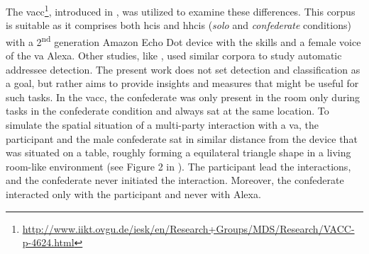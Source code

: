 The \acf{vacc}\footnote{\url{http://www.iikt.ovgu.de/iesk/en/Research+Groups/MDS/Research/VACC-p-4624.html}}, introduced in \citet{Siegert2018VACC}, was utilized to examine these differences.
This corpus is suitable as it comprises both \acp{hci} and \acp{hhci} (\emph{solo} and \emph{confederate} conditions) with a 2\textsuperscript{nd} generation Amazon Echo Dot device with the skills and a female voice of the \acf{va} Alexa.
Other studies, like \citet{Shriberg2013addressee,vanTurnhout2005identifying}, used similar corpora to study automatic addressee detection.
The present work does not set detection and classification as a goal, but rather aims to provide insights and measures that might be useful for such tasks.
In the \ac{vacc}, the confederate was only present in the room only during tasks in the confederate condition and always sat at the same location.
To simulate the spatial situation of a multi-party interaction with a \ac{va}, the participant and the male confederate sat in similar distance from the device that was situated on a table, roughly forming a equilateral triangle shape in a living room-like environment (see Figure 2 in \citet{Siegert2018VACC}).
The participant lead the interactions, and the confederate never initiated the interaction.
Moreover, the confederate interacted only with the participant and never with Alexa.


